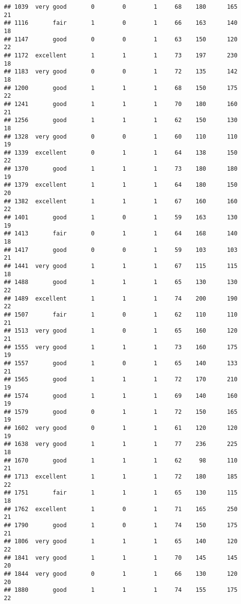 \documentclass[]{article}
\begin{document}
\begin{verbatim}
## 1039  very good       0        0        1     68    180      165  21
## 1116       fair       1        0        1     66    163      140  18
## 1147       good       0        0        1     63    150      120  22
## 1172  excellent       1        1        1     73    197      230  18
## 1183  very good       0        0        1     72    135      142  18
## 1200       good       1        1        1     68    150      175  22
## 1241       good       1        1        1     70    180      160  21
## 1256       good       1        1        1     62    150      130  18
## 1328  very good       0        0        1     60    110      110  19
## 1339  excellent       0        1        1     64    138      150  22
## 1370       good       1        1        1     73    180      180  19
## 1379  excellent       1        1        1     64    180      150  20
## 1382  excellent       1        1        1     67    160      160  22
## 1401       good       1        0        1     59    163      130  19
## 1413       fair       0        1        1     64    168      140  18
## 1417       good       0        0        1     59    103      103  21
## 1441  very good       1        1        1     67    115      115  18
## 1488       good       1        1        1     65    130      130  22
## 1489  excellent       1        1        1     74    200      190  22
## 1507       fair       1        0        1     62    110      110  21
## 1513  very good       1        0        1     65    160      120  21
## 1555  very good       1        1        1     73    160      175  19
## 1557       good       1        0        1     65    140      133  21
## 1565       good       1        1        1     72    170      210  19
## 1574       good       1        1        1     69    140      160  19
## 1579       good       0        1        1     72    150      165  19
## 1602  very good       0        1        1     61    120      120  19
## 1638  very good       1        1        1     77    236      225  18
## 1670       good       1        1        1     62     98      110  21
## 1713  excellent       1        1        1     72    180      185  22
## 1751       fair       1        1        1     65    130      115  18
## 1762  excellent       1        0        1     71    165      250  21
## 1790       good       1        0        1     74    150      175  21
## 1806  very good       1        1        1     65    140      120  22
## 1841  very good       1        1        1     70    145      145  20
## 1844  very good       0        1        1     66    130      120  20
## 1880       good       1        1        1     74    155      175  22

\end{verbatim}
\end{document}
